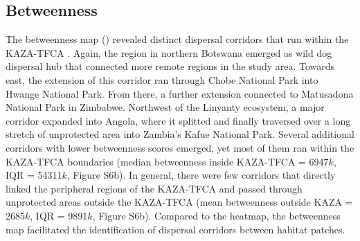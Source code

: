 \documentclass[abstract=on,10pt,a4paper,bibliography=totocnumbered]{article}
\begin{document}
\subsection{Betweenness}
The betweenness map () revealed distinct dispersal corridors
that run within the KAZA-TFCA . Again, the region in northern Botswana emerged
as wild dog dispersal hub that connected more remote regions in the study area.
Towards east, the extension of this corridor ran through Chobe National Park
into Hwange National Park. From there, a further extension connected to
Matusadona National Park in Zimbabwe. Northwest of the Linyanty ecosystem, a
major corridor expanded into Angola, where it splitted and finally traversed
over a long stretch of unprotected area into Zambia's Kafue National Park.
Several additional corridors with lower betweenness scores emerged, yet most of
them ran within the KAZA-TFCA boundaries (median betweenness inside KAZA-TFCA =
6947\(k\), IQR = 54311\(k\), Figure S6b). In general, there were few corridors
that directly linked the peripheral regions of the KAZA-TFCA and passed through
unprotected areas outside the KAZA-TFCA (mean betweenness outside KAZA =
2685\(k\), IQR = 9891\(k\), Figure S6b). Compared to the heatmap, the
betweenness map facilitated the identification of dispersal corridors between
habitat patches.

\end{document}
